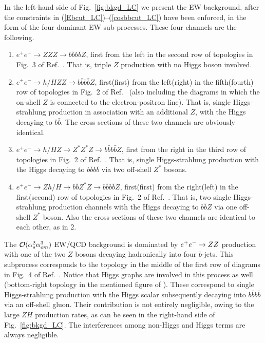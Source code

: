 In the left-hand side of Fig.~\ref{fig:bkgd_LC} we present the EW
background, after the constraints in
(\ref{Ebcut_LC})--(\ref{cosbbcut_LC}) have been enforced, in the form
of the four dominant EW sub-processes.  These four channels are the
following.

\begin{enumerate}
\item $e^+e^-\to ZZZ\to b\bar b b\bar b Z$, first from the left in the
  second row of topologies in Fig.~3 of Ref.~\cite{noi}.  That is,
  triple $Z$ production with no Higgs boson involved.
\item $e^+e^-\to h/HZZ\to b\bar b b\bar b Z$, first(first) from the
  left(right) in the fifth(fourth) row of topologies in Fig.~2 of
  Ref.~\cite{noi} (also including the diagrams in which the on-shell
  $Z$ is connected to the electron-positron line).  That is, single
  Higgs-strahlung production in association with an additional $Z$,
  with the Higgs decaying to $b\bar b$. The cross sections of these
  two channels are obviously identical.
\item $e^+e^-\to h/HZ\to Z^*Z^*Z\to b\bar b b\bar b Z$, first from the
  right in the third row of topologies in Fig.~2 of Ref.~\cite{noi}.
  That is, single Higgs-strahlung production with the Higgs decaying
  to $b\bar b b\bar b$ via two off-shell $Z^*$ bosons.
\item $e^+e^-\to Zh/H\to b\bar b Z^*Z\to b\bar b b\bar b Z$,
  first(first) from the right(left) in the first(second) row of
  topologies in Fig.~2 of Ref.~\cite{noi}.  That is, two single
  Higgs-strahlung production channels with the Higgs decaying to
  $b\bar b Z$ via one off-shell $Z^*$ boson. Also the cross sections
  of these two channels are identical to each other, as in 2.
\end{enumerate}

The ${\cal O}(\alpha_s^2\alpha_{em}^3)$ EW/QCD background is dominated
by $e^+e^-\rightarrow ZZ$ production with one of the two $Z$ bosons decaying
hadronically into four $b$-jets. This subprocess corresponds to the
topology in the middle of the first row of diagrams in Fig.~{4} of
Ref.~\cite{noi}. Notice that Higgs graphs are involved in this process
as well (bottom-right topology in the mentioned figure of \cite{noi}).
These correspond to single Higgs-strahlung production with the Higgs
scalar subsequently decaying into $b\bar bb\bar b$ via an off-shell
gluon. Their contribution is not entirely negligible, owing to the
large $ZH$ production rates, as can be seen in the right-hand side of
Fig.~\ref{fig:bkgd_LC}. The interferences among non-Higgs and Higgs
terms are always negligible.

